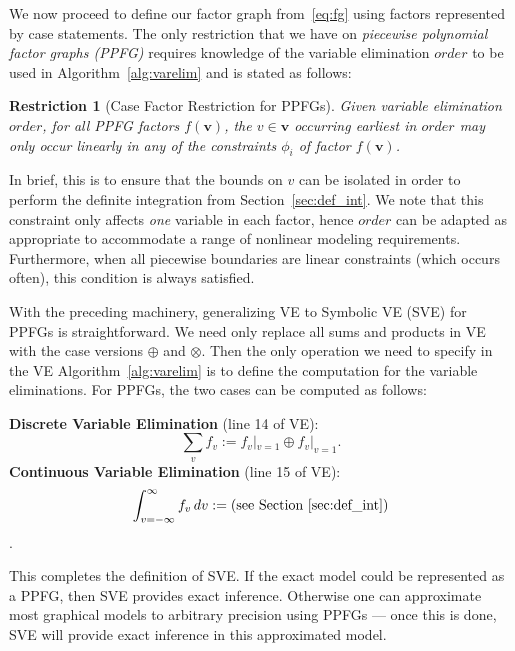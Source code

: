 \documentclass[letterpaper]{article}
\newtheorem{restr}{Restriction}   %
\newcommand{\var}{v}
\renewcommand{\vec}[1]{\mathbf{#1}}
\begin{document}
We now proceed
to define our factor graph from~\eqref{eq:fg} using factors
represented by case statements.  The only restriction that we have on
\emph{piecewise polynomial factor graphs (PPFG)} requires
knowledge of the variable elimination $\mathit{order}$ to be used in
Algorithm~\ref{alg:varelim} and is stated as follows: 
\begin{restr}[Case Factor Restriction for PPFGs]
Given
variable elimination $\mathit{order}$, for all PPFG factors
$f(\vec{v})$, the $v \in \vec{v}$ occurring earliest in
$\mathit{order}$ may only occur linearly in any of the constraints
$\phi_i$ of factor $f(\vec{v})$.
\end{restr}
\vspace{-2mm}
In brief, this is to ensure that the
bounds on $v$ can be isolated in order to perform the definite
integration from Section~\ref{sec:def_int}.  We note that this
constraint only affects \emph{one} variable in each factor, hence
$\mathit{order}$ can be adapted as appropriate to accommodate a range
of nonlinear modeling
requirements.  Furthermore, when all piecewise boundaries are
linear constraints (which occurs often), this condition is always
satisfied.

With the preceding machinery, generalizing VE to Symbolic VE (SVE) for
PPFGs is straightforward.  We need only replace all sums and products
in VE with the case versions $\oplus$ and $\otimes$.  Then the only
operation we need to specify in the VE Algorithm~\ref{alg:varelim} is
to define the computation for the variable
eliminations.  For PPFGs, the two cases can be computed as follows:

{\bf Discrete Variable Elimination} (line 14 of VE):\\
\vspace{-3mm}
$$\sum_v f_v := f_v|_{v=1} \oplus f_v|_{v=1}.$$
\vspace{-2mm}
{\bf Continuous Variable Elimination} (line 15 of VE):\\ 
$$\int_{\var=-\infty}^{\infty} f_\var \, d\var := \mbox{(see Section~\ref{sec:def_int})}$$.

This completes the definition of SVE.  If the exact model could be
represented as a PPFG, then SVE provides exact inference.  Otherwise
one can approximate most graphical models to arbitrary
precision using PPFGs --- once this is done, 
SVE will provide exact inference in this approximated model.

\end{document}
